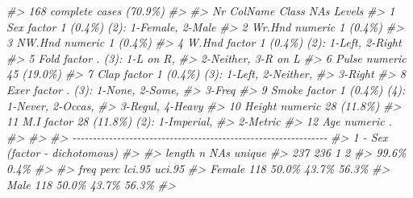 \documentclass[
]{book}
\newenvironment{Shaded}{\begin{snugshade}}{\end{snugshade}}
\newcommand{\CommentTok}[1]{\textcolor[rgb]{0.56,0.35,0.01}{\textit{#1}}}
\begin{document}
\begin{Shaded}
\begin{Highlighting}[]
\CommentTok{\#\textgreater{}      168 complete cases (70.9\%)}
\CommentTok{\#\textgreater{} }
\CommentTok{\#\textgreater{}   Nr  ColName  Class    NAs         Levels                 }
\CommentTok{\#\textgreater{}   1   Sex      factor    1 (0.4\%)   (2): 1{-}Female, 2{-}Male  }
\CommentTok{\#\textgreater{}   2   Wr.Hnd   numeric   1 (0.4\%)                          }
\CommentTok{\#\textgreater{}   3   NW.Hnd   numeric   1 (0.4\%)                          }
\CommentTok{\#\textgreater{}   4   W.Hnd    factor    1 (0.4\%)   (2): 1{-}Left, 2{-}Right   }
\CommentTok{\#\textgreater{}   5   Fold     factor    .          (3): 1{-}L on R,         }
\CommentTok{\#\textgreater{}                                     2{-}Neither, 3{-}R on L    }
\CommentTok{\#\textgreater{}   6   Pulse    numeric  45 (19.0\%)                         }
\CommentTok{\#\textgreater{}   7   Clap     factor    1 (0.4\%)   (3): 1{-}Left, 2{-}Neither,}
\CommentTok{\#\textgreater{}                                     3{-}Right                }
\CommentTok{\#\textgreater{}   8   Exer     factor    .          (3): 1{-}None, 2{-}Some,   }
\CommentTok{\#\textgreater{}                                     3{-}Freq                 }
\CommentTok{\#\textgreater{}   9   Smoke    factor    1 (0.4\%)   (4): 1{-}Never, 2{-}Occas, }
\CommentTok{\#\textgreater{}                                     3{-}Regul, 4{-}Heavy       }
\CommentTok{\#\textgreater{}   10  Height   numeric  28 (11.8\%)                         }
\CommentTok{\#\textgreater{}   11  M.I      factor   28 (11.8\%)  (2): 1{-}Imperial,       }
\CommentTok{\#\textgreater{}                                     2{-}Metric               }
\CommentTok{\#\textgreater{}   12  Age      numeric   .                                 }
\CommentTok{\#\textgreater{} }
\CommentTok{\#\textgreater{} }
\CommentTok{\#\textgreater{} {-}{-}{-}{-}{-}{-}{-}{-}{-}{-}{-}{-}{-}{-}{-}{-}{-}{-}{-}{-}{-}{-}{-}{-}{-}{-}{-}{-}{-}{-}{-}{-}{-}{-}{-}{-}{-}{-}{-}{-}{-}{-}{-}{-}{-}{-}{-}{-}{-}{-}{-}{-}{-}{-}{-}{-}{-}{-}{-}{-}{-}{-}{-} }
\CommentTok{\#\textgreater{} 1 {-} Sex (factor {-} dichotomous)}
\CommentTok{\#\textgreater{} }
\CommentTok{\#\textgreater{}   length      n    NAs unique}
\CommentTok{\#\textgreater{}      237    236      1      2}
\CommentTok{\#\textgreater{}           99.6\%   0.4\%       }
\CommentTok{\#\textgreater{} }
\CommentTok{\#\textgreater{}         freq   perc  lci.95  uci.95\textquotesingle{}}
\CommentTok{\#\textgreater{} Female   118  50.0\%   43.7\%   56.3\%}
\CommentTok{\#\textgreater{} Male     118  50.0\%   43.7\%   56.3\%}
\CommentTok{\#\textgreater{} }

\end{Highlighting}
\end{Shaded}
\end{document}
